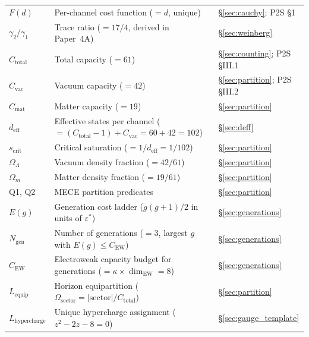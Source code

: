 \documentclass[11pt]{article}
\begin{document}
\begin{center}
\begin{tabular}{lp{8.5cm}l}
$F(d)$ & Per-channel cost function ($= d$, unique) & \S\ref{sec:cauchy}; P2S \S1 \\
$\gamma_2/\gamma_1$ & Trace ratio ($= 17/4$, derived in Paper~4A) & \S\ref{sec:weinberg} \\
$C_{\mathrm{total}}$ & Total capacity ($= 61$) & \S\ref{sec:counting}; P2S \S III.1 \\
$C_{\mathrm{vac}}$ & Vacuum capacity ($= 42$) & \S\ref{sec:partition}; P2S \S III.2 \\
$C_{\mathrm{mat}}$ & Matter capacity ($= 19$) & \S\ref{sec:partition} \\
$d_{\mathrm{eff}}$ & Effective states per channel ($= (C_{\mathrm{total}}-1) + C_{\mathrm{vac}} = 60 + 42 = 102$) & \S\ref{sec:deff} \\
$s_{\mathrm{crit}}$ & Critical saturation ($= 1/d_{\mathrm{eff}} = 1/102$) & \S\ref{sec:partition} \\
$\Omega_\Lambda$ & Vacuum density fraction ($= 42/61$) & \S\ref{sec:partition} \\
$\Omega_m$ & Matter density fraction ($= 19/61$) & \S\ref{sec:partition} \\
Q1, Q2 & MECE partition predicates & \S\ref{sec:partition} \\
$E(g)$ & Generation cost ladder ($g(g+1)/2$ in units of $\varepsilon^*$) & \S\ref{sec:generations} \\
$N_{\mathrm{gen}}$ & Number of generations ($= 3$, largest $g$ with $E(g) \le C_{\mathrm{EW}}$) & \S\ref{sec:generations} \\
$C_{\mathrm{EW}}$ & Electroweak capacity budget for generations ($= \kappa \times \dim_{\mathrm{EW}} = 8$) & \S\ref{sec:generations} \\
$L_{\mathrm{equip}}$ & Horizon equipartition ($\Omega_{\mathrm{sector}} = |\mathrm{sector}|/C_{\mathrm{total}}$) & \S\ref{sec:partition} \\
$L_{\mathrm{hypercharge}}$ & Unique hypercharge assignment ($z^2 - 2z - 8 = 0$) & \S\ref{sec:gauge_template} \\
\bottomrule
\end{tabular}
\end{center}
\end{document}

